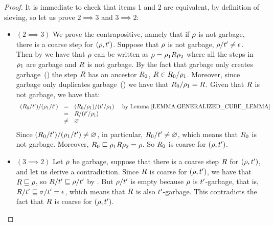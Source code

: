\begin{proof}
It is immediate to check that items 1 and 2 are equivalent, by definition of sieving,
so let us prove $2 \implies 3$ and $3 \implies 2$:
\begin{itemize}
\item $(2 \implies 3)$
  We prove the contrapositive, namely that if $\rho$ is not garbage,
  there is a coarse step for $(\rho,t')$.
  Suppose that $\rho$ is not garbage, \ie $\rho/t' \neq \epsilon$.
  Then by 
  we have that $\rho$ can be written as $\rho = \rho_1 R \rho_2$ where
  all the steps in $\rho_1$ are garbage and $R$ is not garbage.
  By the fact that garbage only creates garbage~()
  the step $R$ has an ancestor $R_0$, \ie $R \in R_0/\rho_1$.
  Moreover, since garbage only duplicates garbage~()
  we have that $R_0/\rho_1 = R$.
  Given that $R$ is not garbage, we have that:
  \[
    \begin{array}{rcll}
          (\redex_0/\tm')/(\redseq_1/\tm')
    & = & (\redex_0/\redseq_1)/(\tm'/\redseq_1) & \text{ by \rlem{generalized_cube_lemma}} \\
    & = & \redex/(\tm'/\redseq_1) \\
    & \neq & \emptyset \\
    \end{array}
  \]
  Since $(R_0/t')/(\rho_1/t') \neq \varnothing$, in particular,
  $R_0/t' \neq \varnothing$, which means that $R_0$ is not garbage.
  Moreover, $R_0 \sqsubseteq \rho_1R\rho_2 = \rho$.
  So $R_0$ is coarse for $(\rho,t')$.
\item $(3 \implies 2)$
  Let $\rho$ be garbage, suppose that there is a coarse step $R$ for $(\rho,t')$,
  and let us derive a contradiction.
  Since $R$ is coarse for $(\rho,t')$,
  we have that $R \sqsubseteq \rho$,
  so $R/t' \sqsubseteq \rho/t'$ by .
  But $\rho/t'$ is empty because $\rho$ is $t'$-garbage,
  that is, $R/t' \sqsubseteq \sigma/t' = \epsilon$,
  which means that $R$ is also $t'$-garbage.
  This contradicts the fact that $R$ is coarse for $(\rho,t')$.
\end{itemize}
\end{proof}


